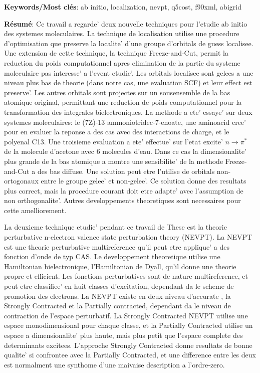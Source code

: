 \documentclass[a4paper,11pt,twoside]{book}
\begin{document}
\textbf{Keywords/Most cl\'es}: ab initio, localization, nevpt, q5cost, f90xml, abigrid

\textbf{R\'esum\'e}:
Ce travail a regarde' deux nouvelle techniques pour l'etudie ab initio des
systemes moleculaires. La technique de localisation utilise une procedure
d'optimisation que preserve la localite' d'une groupe d'orbitals de guess
localisee. Une extension de cette technique, la technique Freeze-and-Cut,
permit la reduction du poids computationnel apres elimination de la partie
du systeme moleculaire pas interesse' a l'event etudie'. Les orbitals
localisee sont gelees a une niveau plus bas de theorie (dans notre cas, une
evaluation SCF) et leur effect est preserve'. Les autres orbitals sont
projectes sur un sousensemble de la bas atomique original, permittant une
reduction de poids computationnel pour la transformation des integrales
bielectroniques. La methode a ete' essaye' sur deux systemes moleculaires:
le (7Z)-13 ammoniotridec-7-enoate, une aminoacid cree' pour en evaluer la
reponse a des cas avec des interactions de charge, et le polyenal C13.
Une troisieme evaluation a ete' effectue' sur l'etat excite' $n \rightarrow
\pi^{*}$ de la
molecule d'acetone avec 6 molecules d'eau. Dans ce cas la dimensionalite'
plus grande de la bas atomique a montre une sensibilite' de la methode
Freeze-and-Cut a des bas diffuse. Une solution peut etre l'utilise de
orbitals non-ortogonaux entre le groupe gelee' et non-gelee'. Ce solution
donne des resultats plus correct, mais la procedure courant doit etre
adapte' avec l'assumption de non orthogonalite'.  Autres developpements
theoretiques sont necessaires pour cette amelliorement.

La deuxieme technique etudie' pendant ce travail de These est la theorie
perturbative n-electron valence state perturbation theory (NEVPT). La NEVPT
est une theorie perturbative multireference qu'il peut etre applique' a des
fonction d'onde de typ CAS. Le developpement theoretique utilise une Hamiltonian
bielectronique, l'Hamiltonian de Dyall, qu'il donne une theorie propre et
efficient. Les fonctions perturbatives sont de nature multireference, et
peut etre classifiee' en huit classes d'excitation, dependant da le scheme
de promotion des electrons. La NEVPT existe en deux niveau d'accurate , la
Strongly Contracted et la Partially contracted, dependant da le niveau de
contraction de l'espace perturbatif. La Strongly Contracted NEVPT utilise 
une espace monodimensional pour chaque classe, et la Partially Contracted 
utilise un espace a dimensionalite' plus haute, mais plus petit que l'espace
complete des determinants excitees.
L'approche Strongly Contracted donne resultats de bonne qualite' si
confrontee avec la Partially Contracted, et une difference entre les deux
est normalment une synthome d'une maivaise description a l'ordre-zero.
\end{document}
